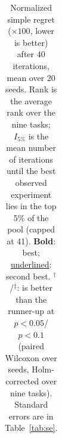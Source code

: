 \begin{table}[t]
\begin{tabular}{@{}l ccccc cccc c c@{}}
\bottomrule
\end{tabular}
\caption{Normalized simple regret ($\times 100$, lower is better) after 40 iterations, mean over 20 seeds. Rank is the average rank over the nine tasks; $I_{5\%}$ is the mean number of iterations until the best observed experiment lies in the top 5\% of the pool (capped at 41). \textbf{Bold}: best; \underline{underlined}: second best. $^{\dagger}$/$^{\ddagger}$: \ours{} is better than the runner-up at $p<0.05$/$p<0.1$ (paired Wilcoxon over seeds, Holm-corrected over nine tasks). Standard errors are in Table~\ref{tab:se}.}
\label{tab:main}
\end{table}
